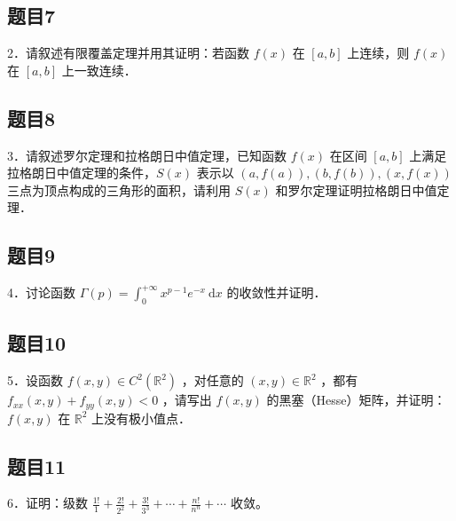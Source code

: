 \documentclass{article}
\begin{document}
\subsection{题目7}
2．请叙述有限覆盖定理并用其证明：若函数 \(f(x)\) 在 \([a, b]\) 上连续，则 \(f(x)\) 在 \([a, b]\) 上一致连续．

\subsection{题目8}
3．请叙述罗尔定理和拉格朗日中值定理，已知函数 \(f(x)\) 在区间 \([a, b]\) 上满足拉格朗日中值定理的条件，\(S(x)\) 表示以 \((a, f(a)),(b, f(b)),(x, f(x))\) 三点为顶点构成的三角形的面积，请利用 \(S(x)\) 和罗尔定理证明拉格朗日中值定理．

\subsection{题目9}
4．讨论函数 \(\Gamma(p)=\int_{0}^{+\infty} x^{p-1} e^{-x} \mathrm{~d} x\) 的收敛性并证明．

\subsection{题目10}
5．设函数 \(f(x, y) \in C^{2}\left(\mathbb{R}^{2}\right)\) ，对任意的 \((x, y) \in \mathbb{R}^{2}\) ，都有 \(f_{x x}(x, y)+f_{y y}(x, y)<0\) ，请写出 \(f(x, y)\) 的黑塞（Hesse）矩阵，并证明：\(f(x, y)\) 在 \(\mathbb{R}^{2}\) 上没有极小值点．

\subsection{题目11}
6．证明：级数 \(\frac{1!}{1}+\frac{2!}{2^{2}}+\frac{3!}{3^{3}}+\cdots+\frac{n!}{n^{n}}+\cdots\) 收敛。
\end{document}
